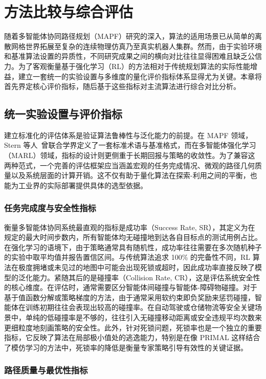 \documentclass[13.5pt]{extarticle}
\begin{document}
\section{方法比较与综合评估}

随着多智能体协同路径规划（MAPF）研究的深入，算法的适用场景已从简单的离散网格世界拓展至复杂的连续物理仿真乃至真实机器人集群。然而，由于实验环境和基准算法设置的异质性，不同研究成果之间的横向对比往往显得困难且缺乏公信力。为了客观衡量基于强化学习（RL）的方法相对于传统规划算法的实际性能增益，建立一套统一的实验设置与多维度的量化评价指标体系显得尤为关键。本章将首先界定核心评价指标，随后基于这些指标对主流算法进行综合对比分析。

\subsection{统一实验设置与评价指标}

建立标准化的评估体系是验证算法鲁棒性与泛化能力的前提。在 MAPF 领域，Stern 等人~\cite{stern2019multi}曾联合学界定义了一套标准术语与基准格式，而在多智能体强化学习（MARL）领域，指标的设计则更侧重于长期回报与策略的收敛性。为了兼容这两种范式，一个完善的评估框架应当涵盖宏观的任务完成情况、微观的路径几何质量以及系统层面的计算开销。这不仅有助于量化算法在探索-利用之间的平衡，也能为工业界的实际部署提供具体的选型依据。

\subsubsection{任务完成度与安全性指标}

衡量多智能体协同系统最直观的指标是成功率（Success Rate, SR），其定义为在规定的最大时间步数内，所有智能体均无碰撞地到达各自目标点的测试用例占比。在强化学习的语境下，由于策略通常具有随机性，成功率往往需要在多次随机种子的实验中取平均值并报告置信区间。与传统算法追求 100\% 的完备性不同，RL 算法在极度拥堵或未见过的地图中可能会出现死锁或超时，因此成功率直接反映了模型的泛化能力。紧随其后的是碰撞率（Collision Rate, CR），这是评估系统安全性的核心维度。在评估时，通常需要区分智能体间碰撞与智能体-障碍物碰撞。对于基于值函数分解或策略梯度的方法，由于通常采用软约束即负奖励来惩罚碰撞，智能体在训练初期往往会表现出较高的碰撞率。在自动驾驶或仓储物流等安全关键场景中，单纯的低碰撞率是不够的，往往引入无碰撞移动距离或安全违规平均次数来更细粒度地刻画策略的安全性。此外，针对死锁问题，死锁率也是一个独立的重要指标，它反映了算法在局部极小值处的逃逸能力，特别是在像 PRIMAL 这样结合了模仿学习的方法中，死锁率的降低是衡量专家策略引导有效性的关键证据。

\subsubsection{路径质量与最优性指标}
\end{document}
